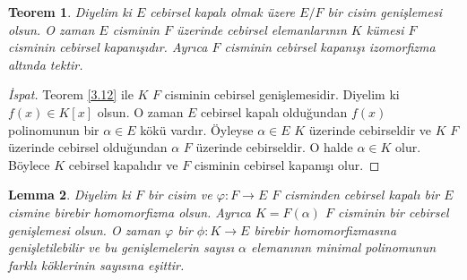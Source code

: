 \documentclass{article}
\newtheorem{thm}{Teorem}[section]
\newtheorem{lem}[thm]{Lemma}
\theoremstyle{definition}
\theoremstyle{remark}
\begin{document}
            \begin{thm}
                Diyelim ki $E$ cebirsel kapalı olmak üzere $E/F$ bir cisim genişlemesi olsun. O zaman $E$ cisminin $F$ üzerinde cebirsel elemanlarının $K$ kümesi $F$ cisminin cebirsel kapanışıdır. Ayrıca $F$ cisminin cebirsel kapanışı izomorfizma altında tektir.
            \end{thm}
            
            \begin{proof}[İspat]
                Teorem \ref{3.12} ile $K$ $F$ cisminin cebirsel genişlemesidir. Diyelim ki $f(x) \in K[x]$ olsun. O zaman $E$ cebirsel kapalı olduğundan $f(x)$ polinomunun bir $\alpha \in E$ kökü vardır. Öyleyse $\alpha \in E$ $K$ üzerinde cebirseldir ve $K$ $F$ üzerinde cebirsel olduğundan $\alpha$ $F$ üzerinde cebirseldir. O halde $\alpha \in K$ olur. Böylece $K$ cebirsel kapalıdır ve $F$ cisminin cebirsel kapanışı olur.
            \end{proof}
            
            \begin{lem}\label{3.16}
                Diyelim ki $F$ bir cisim ve $\varphi: F \to E$ $F$ cisminden cebirsel kapalı bir $E$ cismine birebir homomorfizma olsun. Ayrıca $K = F(\alpha)$ $F$ cisminin bir cebirsel genişlemesi olsun. O zaman $\varphi$ bir $\phi: K \to E$ birebir homomorfizmasına genişletilebilir ve bu genişlemelerin sayısı $\alpha$ elemanının minimal polinomunun farklı köklerinin sayısına eşittir.
            \end{lem}
            
\end{document}
